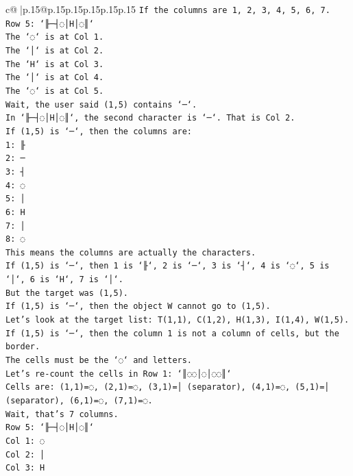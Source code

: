 \documentclass{article}
\begin{document}
{\begin{supertabular}{c@{$\;$}|p{.15\linewidth}@{}p{.15\linewidth}p{.15\linewidth}p{.15\linewidth}p{.15\linewidth}p{.15\linewidth}}
{{{\texttt{If the columns are 1, 2, 3, 4, 5, 6, 7.} \\
\texttt{Row 5: `╟─┤◌│H│◌║`} \\
\texttt{The `◌` is at Col 1.} \\
\texttt{The `│` is at Col 2.} \\
\texttt{The `H` is at Col 3.} \\
\texttt{The `│` is at Col 4.} \\
\texttt{The `◌` is at Col 5.} \\
\texttt{Wait, the user said (1,5) contains `─`.} \\
\texttt{In `╟─┤◌│H│◌║`, the second character is `─`. That is Col 2.} \\
\texttt{If (1,5) is `─`, then the columns are:} \\
\texttt{1: ╟} \\
\texttt{2: ─} \\
\texttt{3: ┤} \\
\texttt{4: ◌} \\
\texttt{5: │} \\
\texttt{6: H} \\
\texttt{7: │} \\
\texttt{8: ◌} \\
\texttt{This means the columns are actually the characters.} \\
\texttt{If (1,5) is `─`, then 1 is `╟`, 2 is `─`, 3 is `┤`, 4 is `◌`, 5 is `│`, 6 is `H`, 7 is `│`.} \\
\texttt{But the target was (1,5).} \\
\texttt{If (1,5) is `─`, then the object W cannot go to (1,5).} \\
\texttt{Let's look at the target list: T(1,1), C(1,2), H(1,3), I(1,4), W(1,5).} \\
\texttt{If (1,5) is `─`, then the column 1 is not a column of cells, but the border.} \\
\texttt{The cells must be the `◌` and letters.} \\
\texttt{Let's re{-}count the cells in Row 1: `║◌◌│◌│◌◌║`} \\
\texttt{Cells are: (1,1)=◌, (2,1)=◌, (3,1)=│ (separator), (4,1)=◌, (5,1)=│ (separator), (6,1)=◌, (7,1)=◌.} \\
\texttt{Wait, that's 7 columns.} \\
\texttt{Row 5: `╟─┤◌│H│◌║`} \\
\texttt{Col 1: ◌} \\
\texttt{Col 2: │} \\
\texttt{Col 3: H} \\
}}}
\end{supertabular}}
\end{document}
